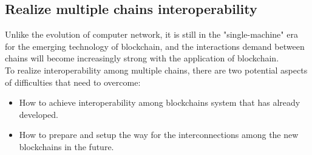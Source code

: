 \subsection{Realize multiple chains interoperability}

\noindent Unlike the evolution of computer network, it is still in the "single-machine" era for the emerging technology of blockchain, and the interactions demand between chains will become increasingly strong with the application of blockchain.\\
\noindent To realize interoperability among multiple chains, there are two potential aspects of difficulties that need to overcome: 
\begin{itemize}
    \item How to achieve interoperability among blockchains system that has already developed.
    \item How to prepare and setup the way for the interconnections among the new blockchains in the future.
\end{itemize}

